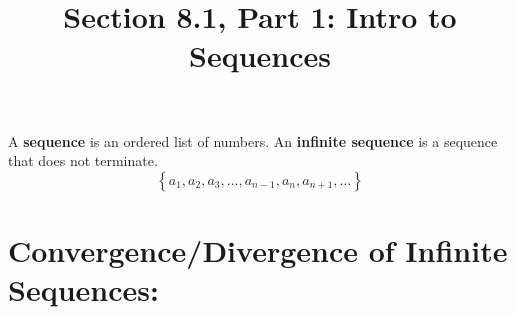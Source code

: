 \documentclass[10pt]{article}
\begin{document}
\everymath{\displaystyle}

\newcommand{\limn}{\lim_{n\rightarrow\infty}}
\newcommand{\liman}{\limn a_n}

\renewcommand{\myTitle}{MATH 1336: Calculus III}


\renewcommand{\mySubTitle}{Section 8.1, Part 1: Intro to Sequences}



\title{\mySubTitle}\date{}
\maketitle


\setlength{\columnseprule}{0.4pt}
\setlength{\columnsep}{3em}

A \textbf{sequence} is an ordered list of numbers. An \textbf{infinite sequence} is a sequence that does not terminate.
\[
\left\lbrace a_1, a_2, a_3, \ldots, a_{n-1}, a_n, a_{n+1}, \ldots \right\rbrace
\]


\vspace*{.1in}
\section*{Convergence/Divergence of Infinite Sequences:}

\end{document}
